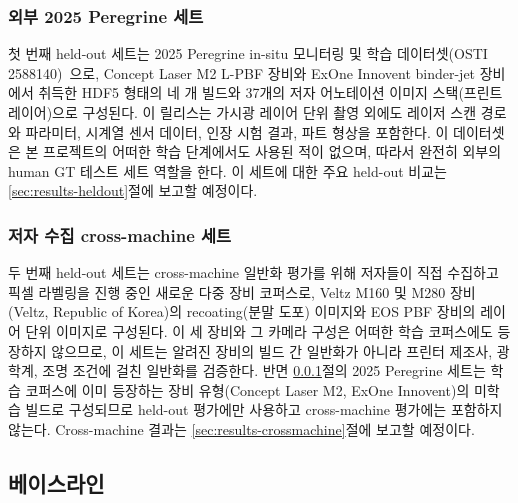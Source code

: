 \subsubsection{외부 2025 Peregrine 세트}
\label{sec:setup-heldout-peregrine}
첫 번째 held-out 세트는 2025 Peregrine in-situ 모니터링 및 학습
데이터셋(OSTI 2588140)~\cite{Peregrine_v2025_TODO}으로, Concept Laser
M2 L-PBF 장비와 ExOne Innovent binder-jet 장비에서 취득한 HDF5 형태의
네 개 빌드와 37개의 저자 어노테이션 이미지 스택(프린트 레이어)으로
구성된다. 이 릴리스는 가시광 레이어 단위 촬영 외에도 레이저 스캔
경로와 파라미터, 시계열 센서 데이터, 인장 시험 결과, 파트 형상을
포함한다. 이 데이터셋은 본 프로젝트의 어떠한 학습 단계에서도 사용된
적이 없으며, 따라서 완전히 외부의 human GT 테스트 세트 역할을 한다.
이 세트에 대한 주요 held-out 비교는 \ref{sec:results-heldout}절에 보고할
예정이다.

\subsubsection{저자 수집 cross-machine 세트}
\label{sec:setup-heldout-crossmachine}
두 번째 held-out 세트는 cross-machine 일반화 평가를 위해 저자들이 직접
수집하고 픽셀 라벨링을 진행 중인 새로운 다중 장비 코퍼스로, Veltz
M160 및 M280 장비(Veltz, Republic of Korea)의 recoating(분말 도포)
이미지와 EOS PBF 장비의 레이어 단위 이미지로 구성된다. 이 세 장비와
그 카메라 구성은 어떠한 학습 코퍼스에도 등장하지 않으므로, 이 세트는
알려진 장비의 빌드 간 일반화가 아니라 프린터 제조사, 광학계, 조명
조건에 걸친 일반화를 검증한다. 반면 \ref{sec:setup-heldout-peregrine}절의
2025 Peregrine 세트는 학습 코퍼스에 이미 등장하는 장비 유형(Concept
Laser M2, ExOne Innovent)의 미학습 빌드로 구성되므로 held-out 평가에만
사용하고 cross-machine 평가에는 포함하지 않는다.
Cross-machine 결과는 \ref{sec:results-crossmachine}절에 보고할 예정이다.

\subsection{베이스라인}\label{sec:setup-baselines}

